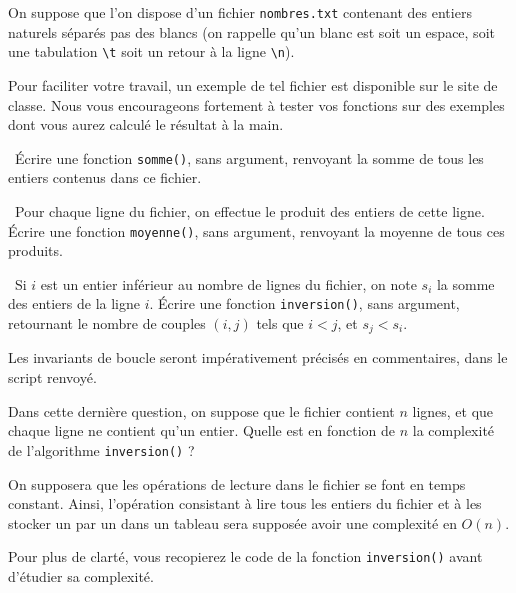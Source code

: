 On suppose que l'on dispose d'un fichier \texttt{nombres.txt} contenant des entiers naturels séparés pas des blancs (on 
rappelle qu'un blanc est soit un espace, soit une tabulation \texttt{\textbackslash t} soit un retour à la ligne 
\texttt{\textbackslash n}).

Pour faciliter votre travail, un exemple de tel fichier est disponible sur le site de classe. Nous vous encourageons fortement à tester vos fonctions sur des exemples dont vous aurez calculé le résultat à la main.  

\medskip

\question\ Écrire une fonction \texttt{somme()}, sans argument, renvoyant la somme de tous les entiers contenus dans ce 
fichier.

\medskip

\question\ Pour chaque ligne du fichier, on effectue le produit des entiers de cette ligne. Écrire une fonction \texttt{moyenne()}, sans 
argument, renvoyant la moyenne de tous ces produits.

\medskip

\question\ Si $i$ est un entier inférieur au nombre de lignes du fichier, on note $s_i$ la somme des entiers de la ligne 
$i$. Écrire une fonction \texttt{inversion()}, sans argument, retournant le nombre de couples $(i, j)$ tels que $i < 
j$, et $s_j<s_i$. 

Les invariants de boucle seront impérativement précisés en commentaires, dans le script renvoyé.

\medskip

\question\label{qu:complexité} Dans cette dernière question, on suppose que le fichier contient $n$ lignes, et que chaque ligne 
ne contient qu'un entier. Quelle est en fonction de $n$ la complexité de l'algorithme \texttt{inversion()} ? 

On supposera que les opérations de lecture dans le fichier se font en temps constant. Ainsi, l'opération consistant à lire tous les 
entiers du fichier et à les stocker un par un dans un tableau sera supposée avoir une complexité en $O(n)$.

Pour plus de clarté, vous recopierez le code de la fonction \texttt{inversion()} avant d'étudier sa complexité. 

